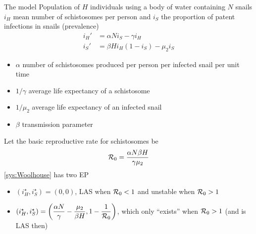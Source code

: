 \documentclass[aspectratio=169]{beamer}
\begin{document}
\begin{frame}{The model}
  Population of $H$ individuals using a body of water containing $N$ snails
  \vfill
  $i_H$ mean number of schistosomes per person and $i_S$ the proportion of patent infections in snails 
  (prevalence)
  \vfill
  \begin{subequations}
    \label{sys:Woolhouse}
    \begin{align}
      i_H' &= \alpha Ni_S-\gamma i_H \\
      i_S' &= \beta Hi_H(1-i_S)-\mu_2 i_S
    \end{align}
  \end{subequations}
  \begin{itemize}
    \item $\alpha$ number of schistosomes produced per person per infected snail per unit time
    \item $1/\gamma$ average life expectancy of a schistosome
    \item $1/\mu_2$ average life expectancy of an infected snail
    \item $\beta$ transmission parameter
  \end{itemize}
\end{frame}

\begin{frame}
  Let the basic reproductive rate for schistosomes be
  \begin{equation}
    \label{eq:R0_Woolhouse}
    \mathcal{R}_0 = \frac{\alpha N\beta H}{\gamma\mu_2}
  \end{equation}
  \vfill
  \eqref{sys:Woolhouse} has two EP
  \begin{itemize}
    \item $(i_H^\star,i_S^\star)=(0,0)$, LAS when $\mathcal{R}_0<1$ and unstable when $\mathcal{R}_0>1$
    \item $(i_H^\star,i_S^\star)=\left(\dfrac{\alpha N}{\gamma}-\dfrac{\mu_2}{\beta H},1-\dfrac{1}{\mathcal{R}_0}\right)$, which only ``exists'' when $\mathcal{R}_0>1$ (and is LAS then)
  \end{itemize}
\end{frame}

\end{document}
